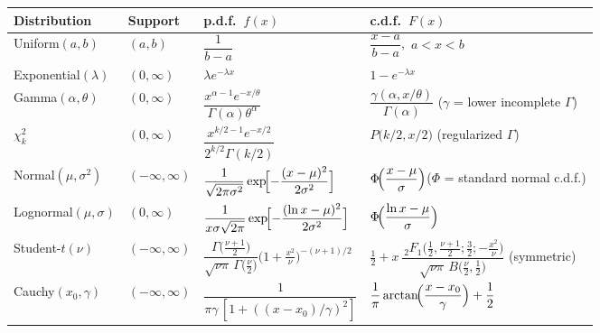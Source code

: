 \documentclass{article}
\begin{document}
\begin{table}[ht]
\centering
\renewcommand{\arraystretch}{1.3}
\small
\begin{tabular}{@{}l l l l@{}}
\toprule
\textbf{Distribution} & \textbf{Support} & \textbf{p.d.f.\ $f(x)$} & \textbf{c.d.f.\ $F(x)$} \\
\midrule
Uniform$(a,b)$            & $(a,b)$ &
$ \dfrac{1}{b-a}$ &
$ \dfrac{x-a}{b-a}$,\ $a<x<b$ \\[6pt]

Exponential$(\lambda)$    & $(0,\infty)$ &
$ \lambda e^{-\lambda x}$ &
$ 1-e^{-\lambda x}$ \\[6pt]

Gamma$(\alpha,\theta)$    & $(0,\infty)$ &
$ \dfrac{x^{\alpha-1}e^{-x/\theta}}{\Gamma(\alpha)\theta^{\alpha}}$ &
$ \dfrac{\gamma(\alpha,x/\theta)}{\Gamma(\alpha)}$\quad
($\gamma$ = lower incomplete $\Gamma$) \\[6pt]

$\chi^{2}_{k}$            & $(0,\infty)$ &
$ \dfrac{x^{k/2-1}e^{-x/2}}{2^{k/2}\Gamma(k/2)}$ &
$ P\!\bigl(k/2,x/2\bigr)$ (regularized $\Gamma$) \\[6pt]

Normal$(\mu,\sigma^{2})$  & $(-\infty,\infty)$ &
$ \dfrac{1}{\sqrt{2\pi\sigma^{2}}}\exp\!\Bigl[-\dfrac{(x-\mu)^{2}}{2\sigma^{2}}\Bigr]$ &
$ \Phi\!\Bigl(\dfrac{x-\mu}{\sigma}\Bigr)$\quad($\Phi$ = standard normal c.d.f.) \\[9pt]

Lognormal$(\mu,\sigma)$   & $(0,\infty)$ &
$ \dfrac{1}{x\sigma\sqrt{2\pi}}\exp\!\Bigl[-\dfrac{(\ln x-\mu)^{2}}{2\sigma^{2}}\Bigr]$ &
$ \Phi\!\Bigl(\dfrac{\ln x-\mu}{\sigma}\Bigr)$ \\[9pt]

Student-$t(\nu)$          & $(-\infty,\infty)$ &
$ \dfrac{\Gamma\!\bigl(\tfrac{\nu+1}{2}\bigr)}
         {\sqrt{\nu\pi}\,\Gamma\!\bigl(\tfrac{\nu}{2}\bigr)}
         \bigl(1+\tfrac{x^{2}}{\nu}\bigr)^{-(\nu+1)/2}$ &
$ \tfrac12 + x\,\dfrac{\,{}_2F_{1}\!\bigl(\tfrac12, \tfrac{\nu+1}{2}; \tfrac32; -\tfrac{x^{2}}{\nu}\bigr)}
                            {\sqrt{\nu\pi}\,B\!\bigl(\tfrac{\nu}{2},\tfrac12\bigr)}$
\quad(symmetric) \\[12pt]

Cauchy$(x_{0},\gamma)$    & $(-\infty,\infty)$ &
$ \dfrac{1}{\pi\gamma\,[1+((x-x_{0})/\gamma)^{2}]}$ &
$ \dfrac{1}{\pi}\arctan\!\Bigl(\dfrac{x-x_{0}}{\gamma}\Bigr)+\dfrac12$ \\[9pt]


\end{tabular}
\end{table}
\end{document}
